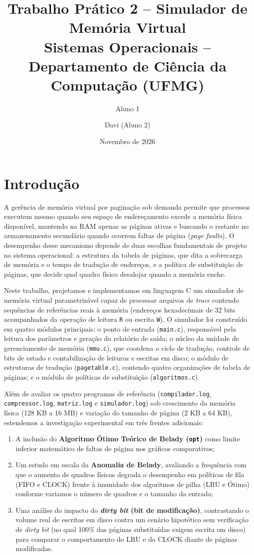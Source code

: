 \documentclass[12pt,a4paper]{article}
\title{\textbf{Trabalho Prático 2 -- Simulador de Memória Virtual}\\
\large Sistemas Operacionais -- Departamento de Ciência da Computação (UFMG)}
\author{Aluno 1 \and Davi (Aluno 2)}
\date{Novembro de 2026}
\begin{document}
\maketitle

\section{Introdução}

A gerência de memória virtual por paginação sob demanda permite que processos executem mesmo quando seu espaço de endereçamento excede a memória física disponível, mantendo na RAM apenas as páginas ativas e buscando o restante no armazenamento secundário quando ocorrem faltas de página (\textit{page faults}). O desempenho desse mecanismo depende de duas escolhas fundamentais de projeto no sistema operacional: a estrutura da tabela de páginas, que dita a sobrecarga de memória e o tempo de tradução de endereços, e a política de substituição de páginas, que decide qual quadro físico desalojar quando a memória enche.

Neste trabalho, projetamos e implementamos em linguagem C um simulador de memória virtual parametrizável capaz de processar arquivos de \textit{trace} contendo sequências de referências reais à memória (endereços hexadecimais de 32 bits acompanhados da operação de leitura \texttt{R} ou escrita \texttt{W}). O simulador foi construído em quatro módulos principais: o ponto de entrada (\texttt{main.c}), responsável pela leitura dos parâmetros e geração do relatório de saída; o núcleo da unidade de gerenciamento de memória (\texttt{mmu.c}), que coordena o ciclo de tradução, controle de bits de estado e contabilização de leituras e escritas em disco; o módulo de estruturas de tradução (\texttt{pagetable.c}), contendo quatro organizações de tabela de páginas; e o módulo de políticas de substituição (\texttt{algoritmos.c}).

Além de avaliar os quatro programas de referência (\texttt{compilador.log}, \texttt{compressor.log}, \texttt{matriz.log} e \texttt{simulador.log}) sob crescimento da memória física (128 KB a 16 MB) e variação do tamanho de página (2 KB a 64 KB), estendemos a investigação experimental em três frentes adicionais:
\begin{enumerate}
    \item A inclusão do \textbf{Algoritmo Ótimo Teórico de Belady (\texttt{opt})} como limite inferior matemático de faltas de página nos gráficos comparativos;
    \item Um estudo em escala da \textbf{Anomalia de Belady}, avaliando a frequência com que o aumento de quadros físicos degrada o desempenho em políticas de fila (FIFO e CLOCK) frente à imunidade dos algoritmos de pilha (LRU e Ótimo) conforme variamos o número de quadros e o tamanho da entrada;
    \item Uma análise do impacto do \textbf{\textit{dirty bit} (bit de modificação)}, contrastando o volume real de escritas em disco contra um cenário hipotético sem verificação de \textit{dirty bit} (no qual 100\% das páginas substituídas exigem escrita em disco) para comparar o comportamento do LRU e do CLOCK diante de páginas modificadas.
\end{enumerate}
\end{document}
